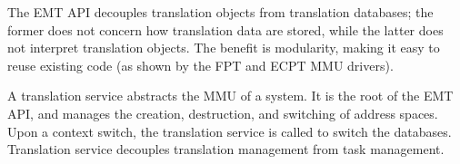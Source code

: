 The EMT API decouples translation objects from translation databases;
	the former does not concern how translation data are stored, while 
	the latter does not interpret translation objects.
The benefit is modularity, making it easy to 
	reuse existing code (as shown by the FPT and ECPT MMU drivers).



\label{emt:sss:fg_3}
A translation service abstracts the MMU of a system.
It is the root of the EMT API, and manages the creation,
	destruction, and switching of address spaces. 
Upon a context switch, the translation service is called to switch 
	the databases.
Translation service decouples translation management 
	from task management.





